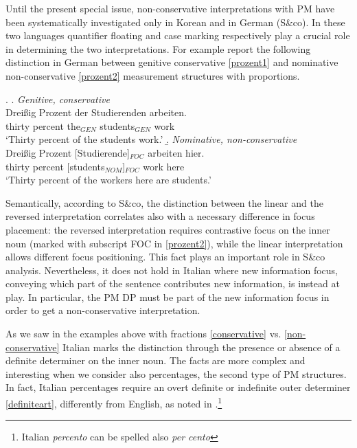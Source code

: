 \documentclass[charis, linguex]{glossa}
\begin{document}
Until the present special issue, non-conservative interpretations with PM have been systematically investigated only in Korean and in German (S\&co). In these two languages quantifier floating and case marking respectively
play a crucial role in determining the two interpretations. For example
\citet[p.219]{ahn17} report the following distinction in German between
genitive conservative \ref{prozent1} and nominative non-conservative \ref{prozent2} measurement structures with proportions. 

\ex. \a. \textit{Genitive, conservative} \\
		\gll Dreißig Prozent der Studierenden arbeiten. \\ 
          thirty percent the$_{GEN}$ students$_{GEN}$ work \\
         \glt `Thirty percent of the students work.'  \label{prozent1}
     \b. \textit{Nominative, non-conservative} \\ 
	 	\gll Dreißig Prozent [Studierende]$_{FOC}$ arbeiten hier. \\
          thirty percent [students$_{NOM}$]$_{FOC}$ work here \\
          \glt `Thirty percent of the workers here are students.'  \label{prozent2}
		 

Semantically, according to S\&co, the distinction between the linear and the
reversed interpretation correlates also with a necessary difference in focus
placement: the reversed interpretation requires contrastive focus on the inner
noun (marked with subscript FOC in \ref{prozent2}), while the linear
interpretation allows different focus positioning. This fact plays an important
role in S\&co analysis. Nevertheless, it does not hold in Italian where new
information focus, conveying which part of the sentence contributes new
information, is instead at play. In particular, the PM DP must be part of the
new information focus in order to get a non-conservative interpretation.

As we saw in the examples above with fractions \ref{conservative} vs. \ref{non-conservative} Italian marks the distinction through the presence or absence of a definite determiner on the inner noun. The facts are more complex and interesting when we consider also percentages, the second type of PM structures. In fact, Italian percentages require an overt definite or indefinite outer determiner \ref{definiteart}, differently from English, as noted in \citet[ex.55]{fal19}.\footnote{Italian \textit{percento} can be spelled also \textit{per cento}}
\end{document}

